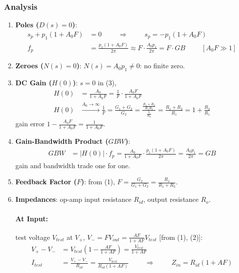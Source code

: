 \subsubsection{Analysis}
\begin{enumerate}
  \item \textbf{Poles (\(D(s) = 0\))}:
    \begin{align*}
      s_p + p_1(1 + A_0 F) &= 0 \hspace{1cm} \Rightarrow \hspace{1cm} s_p = -p_1(1 + A_0 F) \\
      f_p &= \frac{p_1(1 + A_0 F)}{2\pi} \approx F \cdot \frac{A_0 p_1}{2\pi} = F \cdot GB \hspace{1cm} [A_0 F \gg 1]
    \end{align*}
  \item \textbf{Zeroes (\(N(s) = 0\))}: \(N(s) = A_0 p_1 \neq 0\): no finite zero.
  \item \textbf{DC Gain (\(H(0)\))}: \(s = 0\) in (3),
    \begin{align*}
      H(0) &= \frac{A_0}{1 + A_0 F} = \frac{1}{F}\cdot\frac{A_0 F}{1 + A_0 F} \\
      H(0) &\xrightarrow{A_0 \to \infty} \frac{1}{F} = \frac{G_1 + G_2}{G_2} = \frac{\frac{R_1 + R_2}{R_1 R_2}}{\frac{1}{R_2}} = \frac{R_1 + R_2}{R_1} = 1 + \frac{R_2}{R_1}
    \end{align*}
    gain error \(1 - \frac{A_0 F}{1 + A_0 F} = \frac{1}{1 + A_0 F}\).
  \item \textbf{Gain-Bandwidth Product (\(GBW\))}:
    \begin{align*}
      GBW &= |H(0)| \cdot f_p = \frac{A_0}{1 + A_0 F}\cdot\frac{p_1(1 + A_0 F)}{2\pi} = \frac{A_0 p_1}{2\pi} = GB
    \end{align*}
    gain and bandwidth trade one for one.
  \item \textbf{Feedback Factor (\(F\))}: from (1),
    \(F = \frac{G_2}{G_1 + G_2} = \frac{R_1}{R_1 + R_2}\).
  \item \textbf{Impedances}: op-amp input resistance \(R_{id}\), output resistance \(R_o\).
    \paragraph{At Input:} test voltage \(V_{test}\) at \(V_+\),
    \(V_- = F V_{out} = \frac{AF}{1 + AF} V_{test}\) [from (1), (2)]:
    \begin{align*}
      V_+ - V_- &= V_{test}\left(1 - \frac{AF}{1 + AF}\right) = \frac{V_{test}}{1 + AF} \\
      I_{test} &= \frac{V_+ - V_-}{R_{id}} = \frac{V_{test}}{R_{id}(1 + AF)} \hspace{1cm} \Rightarrow \hspace{1cm} Z_{in} = R_{id}(1 + AF)
    \end{align*}

\end{enumerate}
